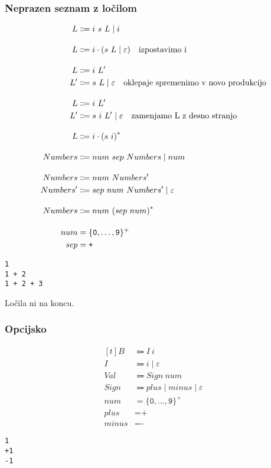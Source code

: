 \documentclass{report}
\newcommand{\Null}{\varepsilon}
\newcommand{\Char}[1]{\texttt{#1}}
\newcommand{\Seq}{\cdot}
\newcommand{\Spc}{\ }
\newcommand{\Union}{\mathrel{|}}
\newcommand{\Kleene}[1]{{#1}^\ast}
\newcommand{\KleenePlus}[1]{#1^+}
\newcommand{\Arrow}{\Coloneq}
\newcommand{\NT}[1]{{#1}}
\newcommand{\T}[1]{{#1}}
\begin{document}
\subsubsection{Neprazen seznam z ločilom}
\begin{equation*}
  \begin{aligned}[t]
    \NT{L} &\Arrow \T{i} \Spc \T{s} \Spc \NT{L} \Union \T{i}\\[1em]
    \NT{L} &\Arrow \T{i} \Seq (\T{s} \Spc \NT{L} \Union \Null)\text{\quad izpostavimo \T{i}}\\[1em]
    \NT{L} &\Arrow \T{i} \Spc \NT{L'}\\
    \NT{L'} &\Arrow \T{s} \Spc \NT{L} \Union \Null \text{\quad oklepaje spremenimo v novo produkcijo}\\[1em]
    \NT{L} &\Arrow \T{i} \Spc \NT{L'}\\
    \NT{L'} &\Arrow \T{s} \Spc \T{i} \Spc \NT{L'} \Union \Null \text{\quad zamenjamo \NT{L} z desno stranjo}\\[1em]
    \NT{L} &\Arrow \T{i} \Seq \Kleene{(\T{s} \Spc \T{i})}\\[1em]
    \NT{Numbers} &\Arrow \T{num} \Spc \T{sep} \Spc \NT{Numbers} \Union \T{num}\\[1em]
    \NT{Numbers} &\Arrow \T{num} \Spc \NT{Numbers'}\\
    \NT{Numbers'} &\Arrow \T{sep} \Spc \T{num} \Spc \NT{Numbers'} \Union \Null\\[1em]
    \NT{Numbers} &\Arrow \T{num} \Spc \Kleene{(\T{sep} \Spc \T{num})}\\[1em]
    \T{num} &= \KleenePlus{\{\Char{0}, \dots, \Char{9}\}}\\
    \T{sep} &= \Char{+}
  \end{aligned}
\end{equation*}
\begin{lstlisting}
1
1 + 2
1 + 2 + 3
\end{lstlisting}
Ločila ni na koncu.

\subsubsection{Opcijsko}
\begin{equation*}
  \begin{aligned}[t]
    \NT{B} &\Arrow \NT{I} \Spc \T{i}\\
    \NT{I} &\Arrow \T{i} \Union \Null \\[1em]
    \NT{Val} &\Arrow \NT{Sign} \Spc \T{num}\\
    \NT{Sign} &\Arrow \T{plus} \Union \T{minus} \Union \Null\\[1em]
    \T{num} &= \KleenePlus{\{\Char{0}, \dots, \Char{9}\}}\\
    \T{plus} &= \Char{+}\\
    \T{minus} &= \Char{-}
  \end{aligned}
\end{equation*}
\begin{lstlisting}
1
+1
-1
\end{lstlisting}
\end{document}
